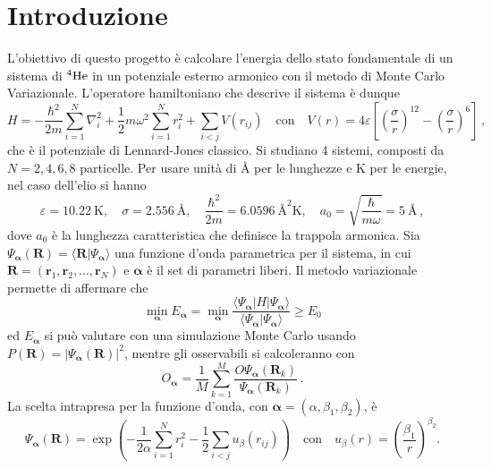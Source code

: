 \documentclass[a4paper, titlepage]{article}
\begin{document}

\newcommand{\sch}[0]{Schrödinger }
\newcommand{\lj}[0]{Lennard-Jones }
\newcommand{\boldalpha}[0]{{\boldsymbol{\alpha}}}

\section{Introduzione}
L'obiettivo di questo progetto è calcolare l'energia dello stato fondamentale di un sistema di $^4\ce{He}$ in un potenziale esterno armonico con il metodo di Monte Carlo Variazionale. L'operatore hamiltoniano che descrive il sistema è dunque
\begin{equation*}
    H = -\frac{\hbar^2}{2m} \sum_{i = 1}^N \nabla_i^2 + \frac{1}{2} m\omega^2 \sum_{i = 1}^N r_i^2 + \sum_{i < j} V(r_{ij}) 
    \quad\text{con}\quad 
    V(r) = 4\varepsilon\left[\left(\frac{\sigma}{r}\right)^{12} - \left(\frac{\sigma}{r}\right)^{6}\right]\, ,
\end{equation*}
che è il potenziale di \lj classico. Si studiano 4 sistemi, composti da $N = 2, 4, 6, 8$ particelle. Per usare unità di \unit{\angstrom} per le lunghezze e \unit{\kelvin} per le energie, nel caso dell'elio si hanno
\[
\varepsilon = 10.22\ \unit{\kelvin}, \quad
\sigma = 2.556\ \unit{\angstrom}, \quad 
\frac{\hbar^2}{2m} = 6.0596\ \unit{\square\angstrom\kelvin}, \quad
a_0 = \sqrt{\frac{\hbar}{m\omega}} = 5\ \unit{\angstrom}\, ,
\]
dove $a_0$ è la lunghezza caratteristica che definisce la trappola armonica.
Sia $\Psi_{\boldsymbol{\alpha}}(\mathbf{R}) = \langle\mathbf{R}|\Psi_{\boldsymbol{\alpha}}\rangle$ una funzione d'onda parametrica per il sistema, in cui $\mathbf{R} = (\mathbf{r}_1, \mathbf{r}_2, \dots, \mathbf{r}_N)$ e $\boldsymbol{\alpha}$ è il set di parametri liberi. Il metodo variazionale permette di affermare che
\[
\min_{\boldsymbol{\alpha}} E_{\boldsymbol{\alpha}} = \min_{\boldsymbol{\alpha}} \frac{\langle\Psi_{\boldsymbol{\alpha}}|H|\Psi_{\boldsymbol{\alpha}}\rangle}{\langle\Psi_{\boldsymbol{\alpha}}|\Psi_{\boldsymbol{\alpha}}\rangle} \geq E_0
\]
ed $E_{\boldsymbol{\alpha}}$ si può valutare con una simulazione Monte Carlo usando $P(\mathbf{R}) = |\Psi_{\boldsymbol{\alpha}}(\mathbf{R})|^2$, mentre gli osservabili si calcoleranno con
\[
O_\boldalpha = \frac{1}{M}\sum_{k = 1}^M \frac{O\Psi_\boldalpha(\mathbf{R}_k)}{\Psi_\boldalpha(\mathbf{R}_k)}\, .
\]
La scelta intrapresa per la funzione d'onda, con $\boldalpha = (\alpha, \beta_1, \beta_2)$, è 
\[
\Psi_\boldalpha(\mathbf{R}) = \exp\left(-\frac{1}{2\alpha}\sum_{i = 1}^Nr_i^2-\frac{1}{2}\sum_{i < j}u_\beta(r_{ij})\right) \quad\text{con}\quad u_\beta(r) = \left(\frac{\beta_1}{r}\right)^{\beta_2}.
\]
\end{document}
